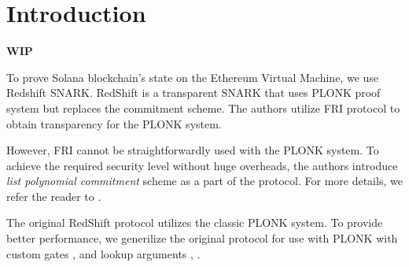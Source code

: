 \section{Introduction}
\label{section:introduction}
\textbf{WIP}

To prove Solana blockchain's state on the Ethereum Virtual Machine, we use Redshift SNARK\cite{cryptoeprint:2019:1400}.
RedShift is a transparent SNARK that uses PLONK\cite{cryptoeprint:2019:953} proof system but replaces the commitment scheme.
The authors utilize FRI\cite{ben2018fast} protocol to obtain transparency for the PLONK system.

However, FRI cannot be straightforwardly used with the PLONK system.
To achieve the required security level without huge overheads, the authors introduce \textit{list polynomial commitment} scheme as a part of the protocol.
For more details, we refer the reader to \cite{cryptoeprint:2019:1400}.

The original RedShift protocol utilizes the classic PLONK\cite{cryptoeprint:2019:953} system.
To provide better performance, we generilize the original protocol for use with PLONK with custom gates \cite{turbo}, \cite{plonkhalo2} and lookup arguments \cite{cryptoeprint:2020:315}, \cite{lookuphalo2}.